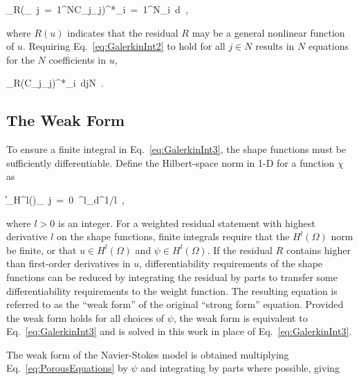 \beq
\label{eq:GalerkinInt2}
\bigintsss_{\Omega}\left\lbrack R\left(\sum_{\ j\ =\ 1}^NC_j\phi_j\right)\right\rbrack^*\sum_{i\ =\ 1}^N\phi_i\ d\ ,
\eeq

\noindent where \(R(u)\) indicates that the residual \(R\) may be a general nonlinear function of \(u\). Requiring Eq.\ \eqref{eq:GalerkinInt2} to hold for all \(j\in N\) results in \(N\) equations for the \(N\) coefficients in \(u\),

\beq
\label{eq:GalerkinInt3}
\int_{\Omega}\left\lbrack R\left(C_j\phi_j\right)\right\rbrack^*\phi_i\ d\hspace{1cm}j\in N\ .
\eeq

\subsection{The Weak Form}
\label{sec:weak_form}

To ensure a finite integral in Eq.\ \eqref{eq:GalerkinInt3}, the shape functions must be sufficiently differentiable. Define the Hilbert-space norm in 1-D for a function \(\chi\) as

\beq
\label{eq:HilbertNorm}
\|\chi\|_{H^l(\Omega)}\equiv\left\lbrack\sum_{\ j\ =\ 0\ }^{l}\int_{\Omega}d\Omega\right\rbrack^{1/l}\ ,
\eeq

\noindent where \(l>0\) is an integer. For a weighted residual statement with highest derivative \(l\) on the shape functions, finite integrals require that the \(H^l(\Omega)\) norm be finite, or that \(u\in H^l(\Omega)\) and \(\psi\in H^l(\Omega)\). If the residual \(R\) contains higher than first-order derivatives in \(u\), differentiability requirements of the shape functions can be reduced by integrating the residual by parts to transfer some differentiability requirements to the weight function. The resulting equation is referred to as the ``weak form'' of the original ``strong form'' equation. Provided the weak form holds for all choices of \(\psi\), the weak form is equivalent to Eq.\ \eqref{eq:GalerkinInt3} and is solved in this work in place of Eq.\ \eqref{eq:GalerkinInt3}.

The weak form of the Navier-Stokes model is obtained multiplying Eq.\ \eqref{eq:PorousEquations} by \(\psi\) and integrating by parts where possible, giving

